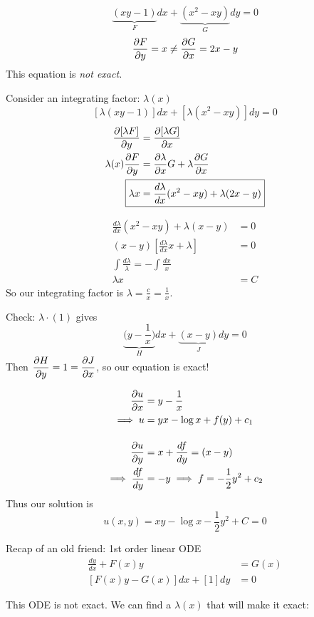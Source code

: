 \documentclass[twoside]{scrartcl}
\begin{document}
\begin{example}
	\[\underbrace{(xy - 1)}_{F}dx + \underbrace{(x^2 -xy)}_{G}dy = 0\]
	\[\frac{\partial F}{\partial y} = x \neq \frac{\partial G}{\partial x} = 2x-y\]
	This equation is \emph{not exact.}
	
	Consider an integrating factor: $\lambda(x)$
	\[[\lambda(xy-1)]dx + [\lambda(x^2-xy)]dy = 0\]
	\[
\begin{aligned}
  \frac{\del[\lambda F]}{\del y} &= \frac{\del[\lambda G]}{\del x}\\
  \lambda(x)\frac{\del F}{\del y} &= \frac{\del \lambda}{\del x}G + \lambda\frac{\del G}{\del x}\\
\Aboxed{  \lambda x &= \frac{d\lambda}{dx}(x^2-xy) + \lambda(2x-y)}
\end{aligned}
\]

\[
\begin{aligned}
  \frac{d\lambda}{dx}(x^2-xy) + \lambda(x-y) &= 0\\
  (x-y)\left[\frac{d\lambda}{dx}x+\lambda\right] &= 0\\
  \int \frac{d\lambda}\lambda = -\int \frac{dx}x\\
  \lambda x &= C
\end{aligned}
\]
So our integrating factor is $\lambda = \frac{c}{x} = \frac{1}{x}$.

Check: $\lambda\cdot (1)$ gives 
\[\underbrace{(y-\textstyle{\frac{1}{x})}}_{H}dx + \underbrace{(x-y)}_{J}dy = 0\]
Then $\dfrac{\partial H}{\partial y} = 1 = \dfrac{\partial J}{\partial x}$, so our equation is exact!

\[
\begin{aligned}
  \frac{\partial u}{\partial x} &= y -\frac{1}{x}\\
 \implies  u &= yx - \log x + f(y) + c_1\\[0.4cm]
  \frac{\partial u}{\partial y} &= x + \frac{df}{dy} = (x-y)\\
  \implies \frac{df}{dy} &= -y \implies f = -\frac{1}{2}y^2 + c_2
\end{aligned}
\]
Thus our solution is 
\[u(x,y) = xy - \log x -\frac{1}{2}y^2 + C = 0\]


\end{example}


Recap of an old friend: 1st order linear ODE
\[
\begin{aligned}
  \frac{dy}{dx} + F(x)y &= G(x)\\
  [F(x)y - G(x)]dx + [1]dy &= 0
\end{aligned}
\]

This ODE is not exact. We can find a $\lambda(x)$ that will make it exact:
\end{document}
